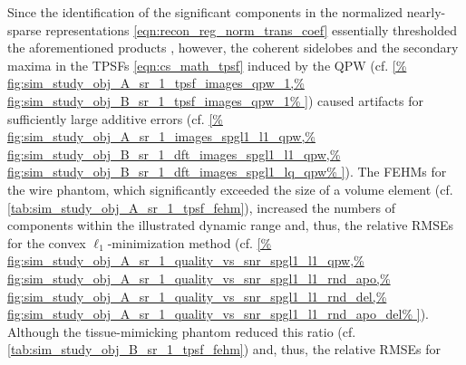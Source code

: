 Since
the identification of
the significant components in
the normalized nearly-sparse representations
\eqref{eqn:recon_reg_norm_trans_coef} essentially thresholded
the aforementioned products
\cite[Fig. 2]{article:LustigMRM2007}, however,
the coherent sidelobes and
the secondary maxima in
the \acp{TPSF}
\eqref{eqn:cs_math_tpsf} induced by
the \ac{QPW}
(cf. \cref{%
  fig:sim_study_obj_A_sr_1_tpsf_images_qpw_1,%
  fig:sim_study_obj_B_sr_1_tpsf_images_qpw_1%
}) caused
artifacts for
sufficiently large additive errors
(cf. \cref{%
  fig:sim_study_obj_A_sr_1_images_spgl1_l1_qpw,%
  fig:sim_study_obj_B_sr_1_dft_images_spgl1_l1_qpw,%
  fig:sim_study_obj_B_sr_1_dft_images_spgl1_lq_qpw%
}).
The \acp{FEHM} for
the wire phantom, which significantly exceeded
the size of
a volume element
(cf. \cref{tab:sim_study_obj_A_sr_1_tpsf_fehm}), increased
the numbers of
components within
the illustrated dynamic range and, thus, the relative \acp{RMSE} for
the convex $\ell_{1}$-minimization method
(cf. \cref{%
  fig:sim_study_obj_A_sr_1_quality_vs_snr_spgl1_l1_qpw,%
  fig:sim_study_obj_A_sr_1_quality_vs_snr_spgl1_l1_rnd_apo,%
  fig:sim_study_obj_A_sr_1_quality_vs_snr_spgl1_l1_rnd_del,%
  fig:sim_study_obj_A_sr_1_quality_vs_snr_spgl1_l1_rnd_apo_del%
}).
Although
the tissue-mimicking phantom reduced
this ratio
(cf. \cref{tab:sim_study_obj_B_sr_1_tpsf_fehm}) and, thus, the relative \acp{RMSE} for
